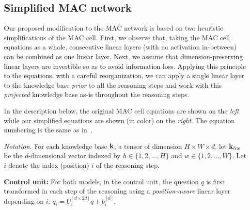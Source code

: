 \subsection{Simplified MAC network}
Our proposed modification to the MAC network is based on two heuristic
simplifications of the MAC cell. 
First, we observe that, taking the MAC cell equations as a whole, consecutive linear layers (with no activation in-between) can be combined as one linear layer.
Next, we assume that dimension-preserving linear layers are invertible
so as to avoid information loss. 
Applying this principle to the equations, with a careful reorganization,
we can apply a single linear layer to the knowledge base \emph{prior}
to all the reasoning steps and work with this \emph{projected} knowledge base
as-is throughout the reasoning steps.



In the description below, the original MAC cell equations are shown on the \emph{left}
while our simplified equations are shown (in color) on the {\color{Plum} \emph{right}}.
The equation numbering is the same as in~\cite{hudson2018compositional}.

\noindent\textit{Notation.}
For each knowledge base $\mathbf{k}$, a tensor of dimension $H \times W \times d$, let $\mathbf{k}_{hw}$ be the $d$-dimensional vector indexed by 
$h \in \{1,2,\dots,H\}$ and $w \in \{1,2,\dots, W\}$.
Let $i$ denote the index (position) $i$ of the reasoning step. 

\noindent\textbf{Control unit:} 
For both models, in the control unit, the question $q$ is first transformed in each step of 
the reasoning using a \emph{position-aware}
linear layer depending on $i$: $q_i = U_i^{[d \times 2d]} q + b_i^{[d]}$.

